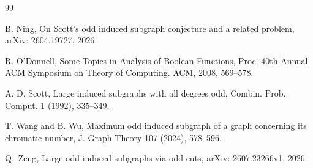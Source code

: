 \documentclass[11pt]{article}
\theoremstyle{definition}
\theoremstyle{remark}
\newcommand{\1}{\mathbf{1}}
\begin{document}
\begin{thebibliography}{99}
		
		
		B. Ning,
		On Scott's odd induced subgraph conjecture and a related problem,
		arXiv: 2604.19727, 2026.
		
		 R. O'Donnell, Some Topics in Analysis of Boolean Functions, Proc. 40th Annual ACM Symposium on Theory of Computing. ACM, 2008, 569--578.
		
		
		
		
		
		 A. D. Scott, Large induced subgraphs with all degrees odd, Combin. Prob. Comput. 1 (1992), 335--349.
		
		T. Wang and B. Wu,
		Maximum odd induced subgraph of a graph concerning its chromatic number,
		J. Graph Theory 107 (2024), 578--596.
		
		Q.~Zeng, Large odd induced subgraphs via odd cuts, arXiv: 2607.23266v1, 2026.
		
		
	\end{thebibliography}
	
	
	
\end{document}
